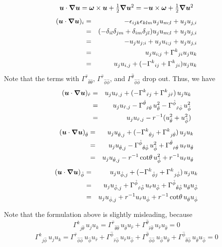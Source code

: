 \documentclass[\mydriver,12pt,twoside,notitlepage,a4paper]{article}
\renewcommand{\vec}[1]{\mbox{\boldmath{$#1$}}}
\newcommand{\uv}            {\vec{u}}
\newcommand{\omv}           {\boldsymbol{\omega}}
\newcommand{\nab}{\mbox{\boldmath $\nabla$} {}}
\def\half{\textstyle{\frac{1}{2}}}
\begin{document}
\begin{equation}
\uv\cdot\nab\uv=\omv\times\uv+\half\nab\uv^2=-\uv\times\omv+\half\nab\uv^2
\end{equation}
\begin{eqnarray}
(\uv\cdot\nab\uv)_i
&=&-\epsilon_{ijk}\epsilon_{klm}u_ju_{m;l}+u_ju_{j,i}
\cr
&=&(-\delta_{il}\delta_{jm}+\delta_{im}\delta_{jl})u_ju_{m;l}+u_ju_{j,i}
\cr
&=&-u_ju_{j;i}+u_ju_{i;j}+u_ju_{j,i}
\cr
&=&u_ju_{i;j}+{\Gamma^k}_{ji}u_ju_{k}
\cr
&=&u_ju_{i,j}+(-{\Gamma^k}_{ij}+{\Gamma^k}_{ji})u_ju_{k}
\end{eqnarray}
Note that the terms with
${\Gamma^{\hat r}}_{{\hat\theta}{\hat\theta}}$,
${\Gamma^{\hat r}}_{{\hat\phi}{\hat\phi}}$, and
${\Gamma^{\hat\theta}}_{{\hat\phi}{\hat\phi}}$ drop out.
Thus, we have
\begin{eqnarray}
(\uv\cdot\nab\uv)_{\hat r}
&=&u_ju_{\hat r,j}+(-{\Gamma^k}_{\hat rj}+{\Gamma^k}_{j\hat r})\,u_ju_{k}
\cr
&=&u_ju_{\hat r,j}-{\Gamma^{\hat\theta}}_{\hat r\hat\theta}\,u_{\hat\theta}^2-{\Gamma^{\hat\phi}}_{\hat r\hat\phi}\,u_{\hat\phi}^2
\cr
&=&u_ju_{\hat r,j}-r^{-1}(u_{\hat\theta}^2+u_{\hat\phi}^2)
\end{eqnarray}
\begin{eqnarray}
(\uv\cdot\nab\uv)_{\hat\theta}
&=&u_ju_{\hat\theta,j}+(-{\Gamma^k}_{\hat\theta j}+{\Gamma^k}_{j\hat\theta})\,u_ju_{k}
\cr
&=&u_ju_{\hat\theta,j}-{\Gamma^{\hat\phi}}_{\hat\theta\hat\phi}\,u_{\hat\phi}^2+{\Gamma^{\hat\theta}}_{\hat r\hat\theta}\,u_{\hat r}u_{\hat\theta}
\cr
&=&u_ju_{\hat\theta,j}-r^{-1}\cot\!\theta\,u_{\hat\phi}^2+r^{-1}u_{\hat r}u_{\hat\theta}
\end{eqnarray}
\begin{eqnarray}
(\uv\cdot\nab\uv)_{\hat\phi}
&=&u_ju_{\hat\phi,j}+(-{\Gamma^k}_{\hat\phi j}+{\Gamma^k}_{j\hat\phi})\,u_ju_{k}
\cr
&=&u_ju_{\hat\phi,j}+{\Gamma^{\hat\phi}}_{\hat r\hat\phi}\,u_{\hat r}u_{\hat\phi}+{\Gamma^{\hat\phi}}_{\hat\theta\hat\phi}\,u_{\hat\theta}u_{\hat\phi}
\cr
&=&u_ju_{\hat\phi,j}+r^{-1}u_{\hat r}u_{\hat\phi}+r^{-1}\cot\!\theta\,u_{\hat\theta}u_{\hat\phi}
\end{eqnarray}

Note that the formulation above is slightly misleading, because
\begin{equation}
{\Gamma^k}_{j\hat\theta}\,u_ju_{k}
={\Gamma^{\hat r}}_{\hat\theta\hat\theta}\,u_{\hat\theta}u_{\hat r}
+{\Gamma^{\hat\theta}}_{\hat r\hat\theta}\,u_{\hat r}u_{\hat\theta}
=0
\end{equation}
\begin{equation}
{\Gamma^k}_{j\hat\phi}\,u_ju_{k}
={\Gamma^{\hat r}}_{\hat\phi\hat\phi}\,u_{\hat\phi}u_{\hat r}
+{\Gamma^{\hat\phi}}_{\hat r\hat\phi}\,u_{\hat r}u_{\hat\phi}
+{\Gamma^{\hat\theta}}_{\hat\phi\hat\phi}\,u_{\hat\phi}u_{\hat\theta}
+{\Gamma^{\hat\phi}}_{\hat\theta\hat\phi}\,u_{\hat\theta}u_{\hat\phi}
=0
\end{equation}
\end{document}
